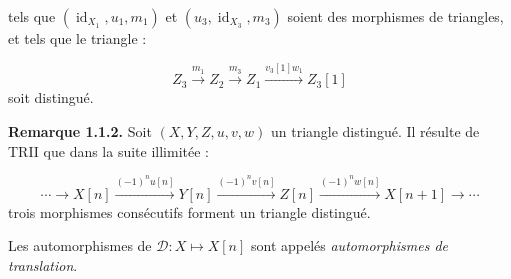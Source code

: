 tels que $(\operatorname{id}_{X_1},u_1,m_1)$ et
$(u_3,\operatorname{id}_{X_3},m_3)$ soient des morphismes de triangles,
et tels que le triangle :

\[
  Z_3\xrightarrow{m_1}Z_2\xrightarrow{m_3}Z_1
  \xrightarrow{v_3[1]w_1}Z_3[1]
\]
soit distingué.

\medskip
\noindent\textbf{Remarque 1.1.2.}\quad
Soit $(X,Y,Z,u,v,w)$ un triangle distingué. Il résulte de TRII que dans la
suite illimitée :

\[
  \cdots\longrightarrow X[n]
  \xrightarrow{(-1)^n u[n]}Y[n]
  \xrightarrow{(-1)^n v[n]}Z[n]
  \xrightarrow{(-1)^n w[n]}X[n+1]
  \longrightarrow\cdots
\]
trois morphismes consécutifs forment un triangle distingué.

Les automorphismes de $\mathcal D\colon X\longmapsto X[n]$ sont appelés
\emph{automorphismes de translation}.
\endgroup
